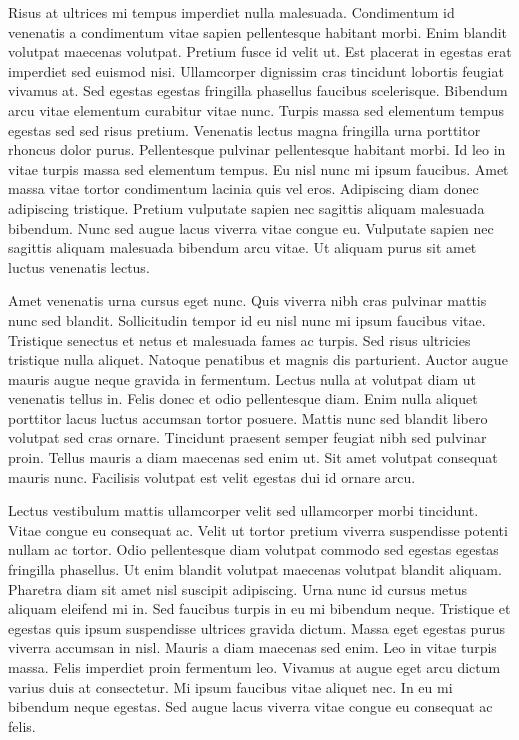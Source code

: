 \documentclass[11pt,a4paper]{article}
\begin{document}
Risus at ultrices mi tempus imperdiet nulla malesuada. Condimentum id venenatis a condimentum vitae sapien pellentesque habitant morbi. Enim blandit volutpat maecenas volutpat. Pretium fusce id velit ut. Est placerat in egestas erat imperdiet sed euismod nisi. Ullamcorper dignissim cras tincidunt lobortis feugiat vivamus at. Sed egestas egestas fringilla phasellus faucibus scelerisque. Bibendum arcu vitae elementum curabitur vitae nunc. Turpis massa sed elementum tempus egestas sed sed risus pretium. Venenatis lectus magna fringilla urna porttitor rhoncus dolor purus. Pellentesque pulvinar pellentesque habitant morbi. Id leo in vitae turpis massa sed elementum tempus. Eu nisl nunc mi ipsum faucibus. Amet massa vitae tortor condimentum lacinia quis vel eros. Adipiscing diam donec adipiscing tristique. Pretium vulputate sapien nec sagittis aliquam malesuada bibendum. Nunc sed augue lacus viverra vitae congue eu. Vulputate sapien nec sagittis aliquam malesuada bibendum arcu vitae. Ut aliquam purus sit amet luctus venenatis lectus.

Amet venenatis urna cursus eget nunc. Quis viverra nibh cras pulvinar mattis nunc sed blandit. Sollicitudin tempor id eu nisl nunc mi ipsum faucibus vitae. Tristique senectus et netus et malesuada fames ac turpis. Sed risus ultricies tristique nulla aliquet. Natoque penatibus et magnis dis parturient. Auctor augue mauris augue neque gravida in fermentum. Lectus nulla at volutpat diam ut venenatis tellus in. Felis donec et odio pellentesque diam. Enim nulla aliquet porttitor lacus luctus accumsan tortor posuere. Mattis nunc sed blandit libero volutpat sed cras ornare. Tincidunt praesent semper feugiat nibh sed pulvinar proin. Tellus mauris a diam maecenas sed enim ut. Sit amet volutpat consequat mauris nunc. Facilisis volutpat est velit egestas dui id ornare arcu.

Lectus vestibulum mattis ullamcorper velit sed ullamcorper morbi tincidunt. Vitae congue eu consequat ac. Velit ut tortor pretium viverra suspendisse potenti nullam ac tortor. Odio pellentesque diam volutpat commodo sed egestas egestas fringilla phasellus. Ut enim blandit volutpat maecenas volutpat blandit aliquam. Pharetra diam sit amet nisl suscipit adipiscing. Urna nunc id cursus metus aliquam eleifend mi in. Sed faucibus turpis in eu mi bibendum neque. Tristique et egestas quis ipsum suspendisse ultrices gravida dictum. Massa eget egestas purus viverra accumsan in nisl. Mauris a diam maecenas sed enim. Leo in vitae turpis massa. Felis imperdiet proin fermentum leo. Vivamus at augue eget arcu dictum varius duis at consectetur. Mi ipsum faucibus vitae aliquet nec. In eu mi bibendum neque egestas. Sed augue lacus viverra vitae congue eu consequat ac felis.
\end{document}
